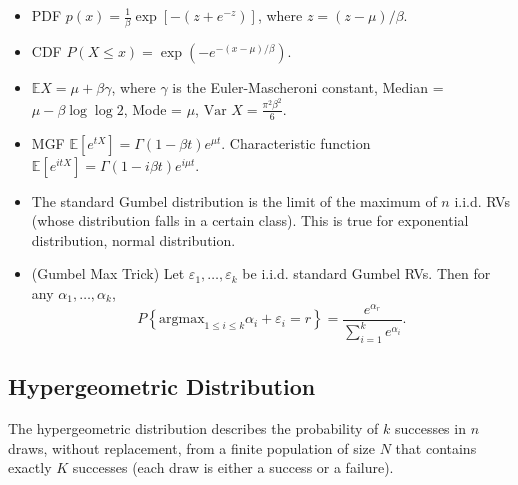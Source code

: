 \documentclass[twoside]{article}
\newcommand\bbE{\mathbb{E}}
\def\eps{\varepsilon}
\newcommand\var{\text{Var }}
\begin{document}
\begin{itemize}
\item PDF $p(x) = \frac{1}{\beta} \exp \left[ - (z + e^{-z}) \right]$, where $z = (z-\mu)/\beta$.

\item CDF $P (X \leq x) = \exp \left( - e^{-(x-\mu)/ \beta} \right)$.

\item $\bbE X = \mu + \beta \gamma$, where $\gamma$ is the Euler-Mascheroni constant, Median = $\mu - \beta \log \log 2$, Mode = $\mu$, $\var X = \displaystyle\frac{\pi^2 \beta^2}{6}$.

\item MGF $\bbE [e^{tX}] = \Gamma(1 - \beta t)e^{\mu t}$. Characteristic function $\bbE [e^{itX}] = \Gamma (1 - i \beta t) e^{i \mu t}$.

\item The standard Gumbel distribution is the limit of the maximum of $n$ i.i.d. RVs (whose distribution falls in a certain class). This is true for exponential distribution, normal distribution.

\item (Gumbel Max Trick) Let $\eps_1, \dots, \eps_k$ be i.i.d. standard Gumbel RVs. Then for any $\alpha_1, \dots, \alpha_k$,
\begin{equation*}
P \left\{ \text{argmax}_{1 \leq i \leq k} \alpha_i + \eps_i = r \right\} = \frac{e^{\alpha_r}}{\sum_{i=1}^k e^{\alpha_i}}.
\end{equation*}

\end{itemize}

\subsection{Hypergeometric Distribution}
The hypergeometric distribution describes the probability of $k$ successes in $n$ draws, without replacement, from a finite population of size $N$ that contains exactly $K$ successes (each draw is either a success or a failure).
\end{document}
